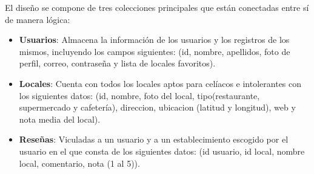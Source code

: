 \documentclass[a4paper,11pt]{article}
\begin{document}
El diseño se compone de tres colecciones principales que están conectadas entre sí de manera lógica:
\begin{itemize}
    \item \textbf{Usuarios}: Almacena la información de los usuarios y los registros de los mismos, incluyendo los campos siguientes: (id, nombre, apellidos, foto de perfil, correo, contraseña y lista de locales favoritos).
    \item \textbf{Locales}: Cuenta con todos los locales aptos para celíacos e intolerantes con los siguientes datos: (id, nombre, foto del local, tipo(restaurante, supermercado y cafetería), direccion, ubicacion (latitud y longitud), web y nota media del local).
    \item \textbf{Reseñas}: Viculadas a un usuario y a un establecimiento escogido por el usuario en el que consta de los siguientes datos: (id usuario, id local, nombre local, comentario, nota (1 al 5)).
\end{itemize}
\end{document}
